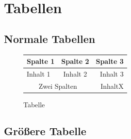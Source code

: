 \chapter{Tabellen}
\section{Normale Tabellen}

\begin{figure}
    \caption{Tabelle}
    \label{Kleine Test Tabelle}
    \begin{tabular}{|l|c|r|}
        \hline
        \textbf{Spalte 1}                  & \textbf{Spalte 2} & \textbf{Spalte 3} \\
        \hline
        Inhalt 1                           & Inhalt 2          & Inhalt 3          \\
        \multicolumn{2}{|c|}{Zwei Spalten} & InhaltX                               \\
        \hline
    \end{tabular}
\end{figure}


\section{Größere Tabelle}

